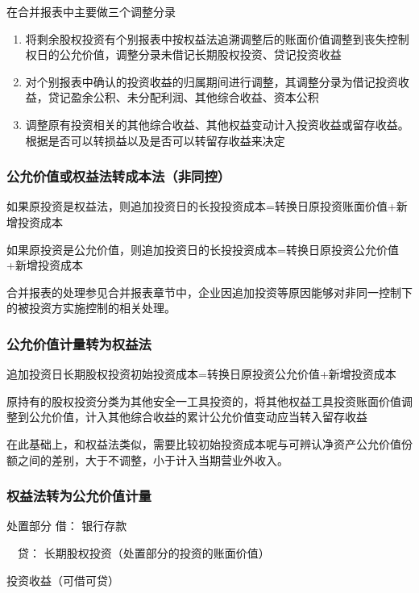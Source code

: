\documentclass[UTF8,12pt]{ctexart}
\newenvironment{Dr}{\noindent 借：}{\par}
\newenvironment{Cr}{\noindent \ \ 贷：}{\par}
\numberwithin{equation}{section} %
\numberwithin{figure}{section}
\numberwithin{table}{section}
\begin{document}
	在合并报表中主要做三个调整分录
	\begin{enumerate}
		\item 将剩余股权投资有个别报表中按权益法追溯调整后的账面价值调整到丧失控制权日的公允价值，调整分录未借记长期股权投资、贷记投资收益
		
		\item 对个别报表中确认的投资收益的归属期间进行调整，其调整分录为借记投资收益，贷记盈余公积、未分配利润、其他综合收益、资本公积
		
		\item 调整原有投资相关的其他综合收益、其他权益变动计入投资收益或留存收益。根据是否可以转损益以及是否可以转留存收益来决定
	\end{enumerate}
	
	\subsubsection{公允价值或权益法转成本法（非同控）}
	如果原投资是权益法，则追加投资日的长投投资成本=转换日原投资账面价值+新增投资成本
	
	如果原投资是公允价值，则追加投资日的长投投资成本=转换日原投资公允价值+新增投资成本
	
	合并报表的处理参见合并报表章节中，企业因追加投资等原因能够对非同一控制下的被投资方实施控制的相关处理。
	
	\subsubsection{公允价值计量转为权益法}
	
	追加投资日长期股权投资初始投资成本=转换日原投资公允价值+新增投资成本
	
	原持有的股权投资分类为其他安全一工具投资的，将其他权益工具投资账面价值调整到公允价值，计入其他综合收益的累计公允价值变动应当转入留存收益
	
	在此基础上，和权益法类似，需要比较初始投资成本呢与可辨认净资产公允价值份额之间的差别，大于不调整，小于计入当期营业外收入。
	
	\subsubsection{权益法转为公允价值计量}
	处置部分
	\begin{Dr}
		银行存款
	\end{Dr}
	\begin{Cr}
		长期股权投资（处置部分的投资的账面价值）
		
		投资收益（可借可贷）
	\end{Cr}
	
\end{document}
